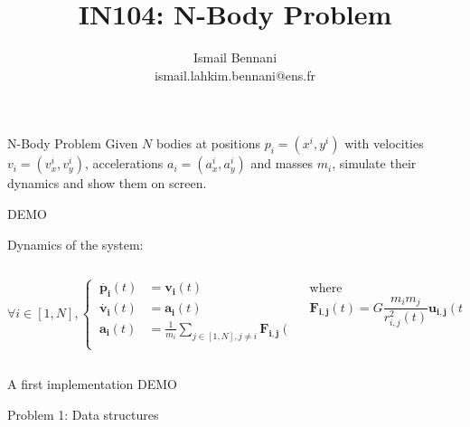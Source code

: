\documentclass[colorlinks]{beamer}
\title{IN104: N-Body Problem}
\author{Ismail Bennani\\ismail.lahkim.bennani@ens.fr}
\newcommand{\myvec}[1]{\ensuremath{\mathbf{#1}}}
\begin{document}
\maketitle

\begin{frame}{N-Body Problem}
    Given $N$ bodies at positions $p_i = (x^i, y^i)$ with velocities $v_i = (v_x^i, v_y^i)$, accelerations $a_i = (a_x^i, a_y^i)$ and masses $m_i$, simulate their dynamics and show them on screen. 

    \vspace{1em}

    {\centering DEMO \par}

    \vspace{1em}

    Dynamics of the system:
    \begin{columns}
        \begin{column}{.55\textwidth}
            \begin{equation*}
                \forall i \in [1,N], \left\{\begin{aligned}
                    \ \myvec{\dot{p_i}}(t) & = \myvec{v_i}(t) \\
                    \ \myvec{\dot{v_i}}(t) & = \myvec{a_i}(t) \\
                    \ \myvec{a_i}(t) & = \frac{1}{m_i} \sum_{j \in [1,N], j \ne i} \myvec{F_{i,j}}(t) \\
                \end{aligned}\right.
            \end{equation*}
        \end{column}\hfill\vrule\hfill
        \begin{column}{.4\textwidth}
            where 
            \begin{equation*}
                \myvec{F_{i,j}}(t) = G \frac{m_im_j}{r^2_{i,j}(t)} \myvec{u_{i,j}}(t)
            \end{equation*}
        \end{column}
    \end{columns}
\end{frame}

\begin{frame}{A first implementation}
    \centering DEMO
\end{frame}

\begin{frame}\centering\huge Problem 1: Data structures\end{frame}
\end{document}
